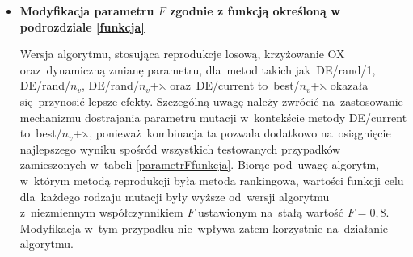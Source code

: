 \begin{itemize}
\item \textbf{Modyfikacja parametru $F$ zgodnie z funkcją określoną w podrozdziale \ref{funkcja}}\\

\begin{table}[h!]
\begin{center}
\caption{Wartości średniego błędu względnego funkcji celu dla poszczególnych metod mutacji ze zmiennym parametrem F zgodnie z funkcją \ref{funkcja}.}
\label{parametrFfunkcja}
\end{center}
\end{table}

Wersja algorytmu, stosująca reprodukcje losową, krzyżowanie OX oraz~dynamiczną zmianę parametru, dla~metod takich jak~DE/rand/1, DE/rand/$n_{v}$, DE/rand/$n_{v}$+$\leftthreetimes$ oraz~DE/current to~best/$n_{v}$+$\leftthreetimes$ okazała się~przynosić lepsze efekty. Szczególną uwagę należy zwrócić na~zastosowanie mechanizmu dostrajania parametru mutacji w~kontekście metody DE/current to~best/$n_{v}$+$\leftthreetimes$, ponieważ~kombinacja ta pozwala dodatkowo na~osiągnięcie najlepszego wyniku spośród wszystkich testowanych przypadków zamieszonych w~tabeli \ref{parametrFfunkcja}. Biorąc pod~uwagę algorytm, w~którym metodą reprodukcji była metoda rankingowa, wartości funkcji celu dla~każdego rodzaju mutacji były wyższe od~wersji algorytmu z~niezmiennym współczynnikiem $F$ ustawionym na~stałą wartość $F =0,8$. Modyfikacja w~tym przypadku nie~wpływa zatem korzystnie na~działanie algorytmu.\\



\end{itemize}
